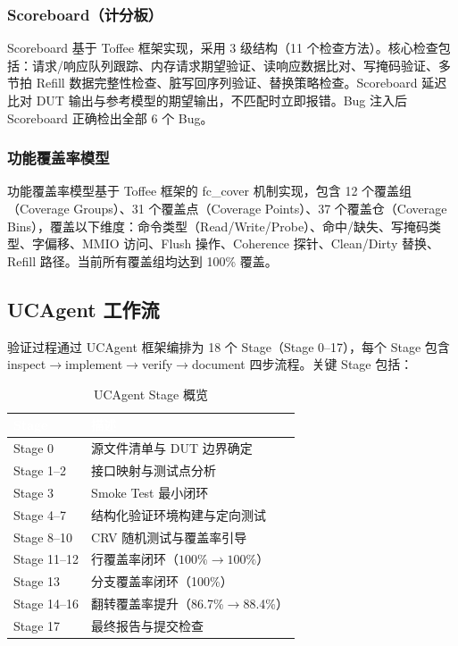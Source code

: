 \documentclass[12pt,a4paper]{ctexart}
\newcommand{\thcell}[1]{\textcolor{white}{\bfseries #1}}
\begin{document}
\subsubsection{Scoreboard（计分板）}

Scoreboard 基于 Toffee 框架实现，采用 3 级结构（11 个检查方法）。核心检查包括：请求/响应队列跟踪、内存请求期望验证、读响应数据比对、写掩码验证、多节拍 Refill 数据完整性检查、脏写回序列验证、替换策略检查。Scoreboard 延迟比对 DUT 输出与参考模型的期望输出，不匹配时立即报错。Bug 注入后 Scoreboard 正确检出全部 6 个 Bug。

\subsubsection{功能覆盖率模型}

功能覆盖率模型基于 Toffee 框架的 fc\_cover 机制实现，包含 12 个覆盖组（Coverage Groups）、31 个覆盖点（Coverage Points）、37 个覆盖仓（Coverage Bins），覆盖以下维度：命令类型（Read/Write/Probe）、命中/缺失、写掩码类型、字偏移、MMIO 访问、Flush 操作、Coherence 探针、Clean/Dirty 替换、Refill 路径。当前所有覆盖组均达到 100\% 覆盖。

\subsection{UCAgent 工作流}

验证过程通过 UCAgent 框架编排为 18 个 Stage（Stage 0--17），每个 Stage 包含 inspect$\rightarrow$implement$\rightarrow$verify$\rightarrow$document 四步流程。关键 Stage 包括：

\begin{table}[H]
\centering
\caption{UCAgent Stage 概览}
\renewcommand{\arraystretch}{1.3}
\begin{tabular}{@{}p{2.2cm}p{10cm}@{}}
\toprule
\rowcolor{primaryblue}
\thcell{Stage} & \thcell{描述} \\
\midrule
\rowcolor{rowgray} Stage 0 & 源文件清单与 DUT 边界确定 \\
Stage 1--2 & 接口映射与测试点分析 \\
\rowcolor{rowgray} Stage 3 & Smoke Test 最小闭环 \\
Stage 4--7 & 结构化验证环境构建与定向测试 \\
\rowcolor{rowgray} Stage 8--10 & CRV 随机测试与覆盖率引导 \\
Stage 11--12 & 行覆盖率闭环（$100\%\rightarrow100\%$） \\
\rowcolor{rowgray} Stage 13 & 分支覆盖率闭环（100\%） \\
Stage 14--16 & 翻转覆盖率提升（86.7\%$\rightarrow$88.4\%） \\
\rowcolor{rowgray} Stage 17 & 最终报告与提交检查 \\
\bottomrule
\end{tabular}
\end{table}
\end{document}
